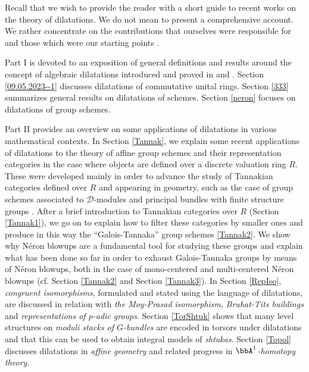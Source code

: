\documentclass[10pt]{alggeom}
\theoremstyle{definition}
\numberwithin{equation}{section}
\begin{document}
Recall that we wish to provide the reader with a short guide to recent works on  the theory of  dilatations. We do not mean to present a comprehensive account. We rather concentrate on the contributions that ourselves were responsible for  \cite{Du05, DF18, duong-hai-dos_santos18,  Ma19t, hai-dos_santos21, MRR20, ADO21, Ma23d} and those which were our starting points \cite{artin69, Ana73, And01, WW80, BLR90, KZ99, Yu15, PY06, PZ13, HKO16}. 

Part I is devoted to an exposition of general definitions and results around the concept of algebraic dilatations introduced and proved in \cite{MRR20} and \cite{Ma23d}. Section \ref{09.05.2023--1} discusses dilatations of commutative unital rings. Section \ref{333} summarizes general results on dilatations of schemes. Section \ref{neron} focuses on dilatations of group schemes.


 Part II provides an overview on some applications of dilatations in various mathematical contexts. 
In Section \ref{Tannak}, we explain some recent applications of dilatations to the theory of affine group schemes and their representation categories in the case where objects are defined over a discrete valuation ring $R$. These were developed mainly in order to advance the study of Tannakian categories defined over $R$ and  appearing in geometry, such as  the case of group schemes associated to $\mathcal D$-modules \cite{And01,dos_santos09,duong-hai18,duong-hai-dos_santos18,hai-dos_santos21} and principal bundles with finite structure groups \cite{hai-dos_santos23}. After a brief introduction to Tannakian categories over $R$ (Section \ref{Tannak1}), we go  on to explain how to filter these categories by smaller ones and produce in this way the ``Galois-Tannaka'' group schemes \ref{Tannak2}. We show why N\'eron blowups are a fundamental tool for studying these groups and explain what has been done so far in order to exhaust Galois-Tannaka groups by means of N\'eron blowups, both in the case of mono-centered and multi-centered N\'eron blowups (cf. Section \ref{Tannak2} and Section \ref{Tannak3}).  
  In Section \ref{RepIso}, \textit{congruent isomorphisms},  formulated and stated using the language of dilatations, are discussed in relation with \textit{the Moy-Prasad isomorphism}, \textit{Bruhat-Tits buildings} and \textit{representations of $p$-adic groups}. Section \ref{TorShtuk} shows that many level structures
on \textit{moduli stacks of $G$-bundles} are encoded in torsors under dilatations and that this can be used to obtain integral models of \textit{shtukas}. Section \ref{Topol} discusses dilatations in \textit{affine geometry} and related progress in \textit{$\bbA ^1$-homotopy theory}.
\end{document}
